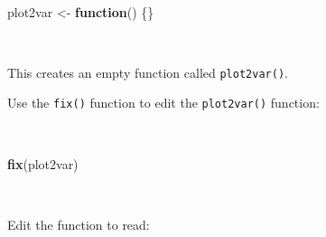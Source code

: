 \documentclass[12pt,a4paper]{book}
\newenvironment{Shaded}{\begin{snugshade}}{\end{snugshade}}
\newcommand{\KeywordTok}[1]{\textcolor[rgb]{0.13,0.29,0.53}{\textbf{#1}}}
\newcommand{\StringTok}[1]{\textcolor[rgb]{0.31,0.60,0.02}{#1}}
\newcommand{\ControlFlowTok}[1]{\textcolor[rgb]{0.13,0.29,0.53}{\textbf{#1}}}
\newcommand{\NormalTok}[1]{#1}
\theoremstyle{definition}
\theoremstyle{definition}
\theoremstyle{definition}
\theoremstyle{remark}
\begin{document}
~

\begin{Shaded}
\begin{Highlighting}[]
\NormalTok{plot2var <-}\StringTok{ }\ControlFlowTok{function}\NormalTok{() \{\}}
\end{Highlighting}
\end{Shaded}

~

This creates an empty function called \texttt{plot2var()}.

Use the \texttt{fix()} function to edit the \texttt{plot2var()}
function:

~

\begin{Shaded}
\begin{Highlighting}[]
\KeywordTok{fix}\NormalTok{(plot2var)}
\end{Highlighting}
\end{Shaded}

~

Edit the function to read:

~
\end{document}
